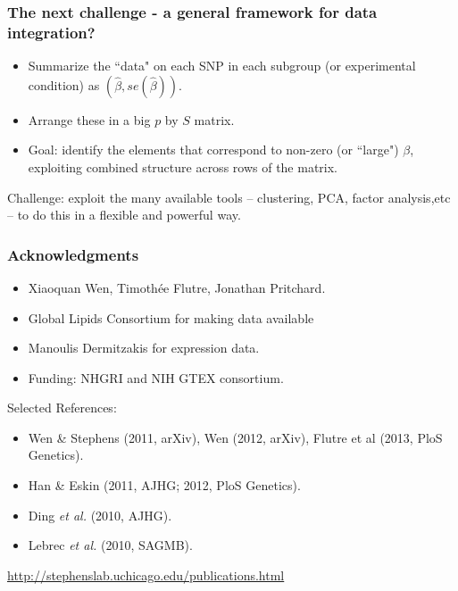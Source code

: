\documentclass[ignorenonframetext]{beamer}
\begin{document}
\begin{frame}[fragile]
\frametitle{The next challenge - a general framework for data integration?}

\begin{itemize}
\item Summarize the ``data" on each SNP in each subgroup (or experimental condition) as $(\hat\beta, se(\hat\beta))$.
\item Arrange these in a big $p$ by $S$ matrix.
\item Goal: identify the elements that correspond to non-zero (or ``large") $\beta$, exploiting combined structure
across rows of the matrix.
\end{itemize}

Challenge: exploit the many available tools -- clustering, PCA, factor analysis,etc -- to do this in a flexible and powerful way.

\end{frame}



\begin{frame}
\frametitle{Acknowledgments}

\begin{itemize}
\item  Xiaoquan Wen,  Timoth\'ee Flutre, Jonathan Pritchard. 
\item Global Lipids Consortium for making data available
\item Manoulis Dermitzakis for expression data.
\item Funding: NHGRI and NIH GTEX consortium.
\end{itemize}

Selected References:
\begin{itemize}
\item Wen \& Stephens (2011, arXiv), Wen (2012, arXiv), Flutre et al (2013, PloS Genetics).
\item Han \& Eskin (2011, AJHG; 2012, PloS Genetics).
\item Ding \textit{et al.} (2010, AJHG).
\item Lebrec \textit{et al.} (2010, SAGMB).
\end{itemize}
\url{http://stephenslab.uchicago.edu/publications.html}
\end{frame}
\end{document}
